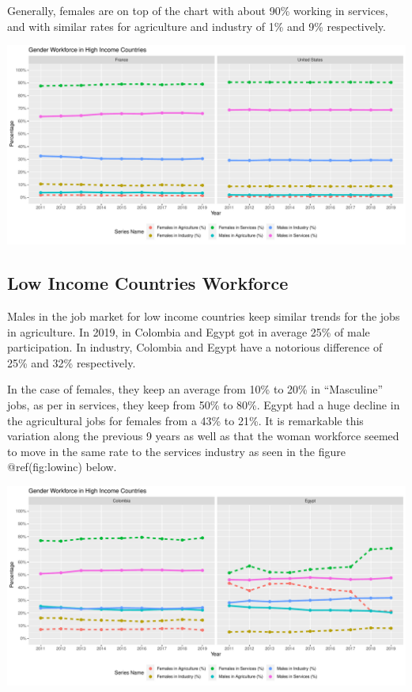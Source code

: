 \documentclass[
]{article}
\begin{document}
Generally, females are on top of the chart with about 90\% working in
services, and with similar rates for agriculture and industry of 1\% and
9\% respectively.

\includegraphics{The_Outsiders_5513_files/figure-latex/highinc-1.pdf}

\hypertarget{low-income-countries-workforce}{%
\subsection{Low Income Countries
Workforce}\label{low-income-countries-workforce}}

Males in the job market for low income countries keep similar trends for
the jobs in agriculture. In 2019, in Colombia and Egypt got in average
25\% of male participation. In industry, Colombia and Egypt have a
notorious difference of 25\% and 32\% respectively.

In the case of females, they keep an average from 10\% to 20\% in
``Masculine'' jobs, as per in services, they keep from 50\% to 80\%.
Egypt had a huge decline in the agricultural jobs for females from a
43\% to 21\%. It is remarkable this variation along the previous 9 years
as well as that the woman workforce seemed to move in the same rate to
the services industry as seen in the figure @ref(fig:lowinc) below.

\includegraphics{The_Outsiders_5513_files/figure-latex/lowinc-1.pdf}
\end{document}
